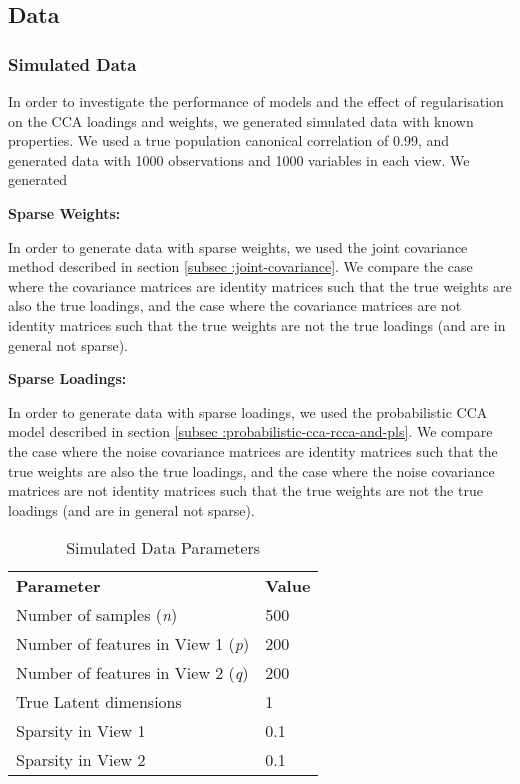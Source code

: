 \subsection{Data}

\subsubsection{Simulated Data}

In order to investigate the performance of models and the effect of regularisation on the CCA loadings and weights,
we generated simulated data with known properties. We used a true population canonical correlation of 0.99, and
generated data with 1000 observations and 1000 variables in each view. We generated

\textbf{Sparse Weights:}

In order to generate data with sparse weights, we used the joint covariance method described in section \ref{subsec
:joint-covariance}. We compare the case where the covariance matrices are identity matrices such that the true weights
are also the true loadings, and the case where the covariance matrices are not identity matrices such that the true
weights are not the true loadings (and are in general not sparse).

\textbf{Sparse Loadings:}

In order to generate data with sparse loadings, we used the probabilistic CCA model described in section \ref{subsec
:probabilistic-cca-rcca-and-pls}. We compare the case where the noise covariance matrices are identity matrices such
that the true weights are also the true loadings, and the case where the noise covariance matrices are not identity matrices
such that the true weights are not the true loadings (and are in general not sparse).

\begin{table}[h]
\centering
\caption{Simulated Data Parameters}
\begin{tabular}{| l | l |}
\textbf{Parameter} & \textbf{Value} \\
Number of samples (\textit{n}) & 500 \\
Number of features in View 1 (\textit{p}) & 200 \\
Number of features in View 2 (\textit{q}) & 200 \\
True Latent dimensions & 1 \\
Sparsity in View 1 & 0.1 \\
Sparsity in View 2 & 0.1 \\
\end{tabular}
\end{table}



